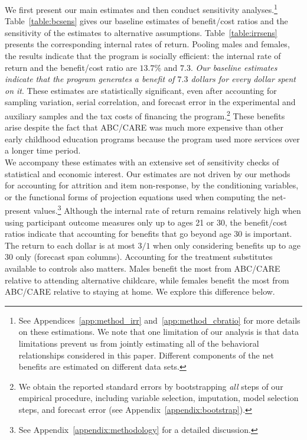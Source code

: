 \noindent We first present our main estimates and then conduct sensitivity analyses.\footnote{See Appendices~\ref{app:method_irr} and~\ref{app:method_cbratio} for more details on these estimations. We note that one limitation of our analysis is that data limitations prevent us from jointly estimating all of the behavioral relationships considered in this paper. Different components of the net benefits are estimated on different data sets.} Table~\ref{table:bcsens} gives our baseline estimates of benefit/cost ratios and the sensitivity of the estimates to alternative assumptions. Table~\ref{table:irrsens} presents the corresponding internal rates of return. Pooling males and females, the results indicate that the program is socially efficient: the internal rate of return and the benefit/cost ratio are $13.7\%$ and $7.3$. \textit{Our baseline estimates indicate that the program generates a benefit of $7.3$ dollars for every dollar spent on it}. These estimates are statistically significant, even after accounting for sampling variation, serial correlation, and forecast error in the experimental and auxiliary samples and the tax costs of financing the program.\footnote{We obtain the reported standard errors by bootstrapping \emph{all} steps of our empirical procedure, including variable selection, imputation, model selection steps, and forecast error (see  Appendix~\ref{appendix:bootstrap}).} These benefits arise despite the fact that ABC/CARE was much more expensive than other early childhood education programs because the program used more services over a longer time period.\\

\noindent We accompany these estimates with an extensive set of sensitivity checks of statistical and economic interest. Our estimates are not driven by our methods for accounting for attrition and item non-response, by the conditioning variables, or the functional forms of projection equations used when computing the net-present values.\footnote{See Appendix~\ref{appendix:methodology} for a detailed discussion.} Although the internal rate of return remains relatively high when using participant outcome measures only up to ages 21 or 30, the benefit/cost ratios indicate that accounting for benefits that go beyond age 30 is important. The return to each dollar is at most $3/1$ when only considering benefits up to age 30 only (forecast span columns). Accounting for the treatment substitutes available to controls also matters. Males benefit the most from ABC/CARE relative to attending alternative childcare, while females benefit the most from ABC/CARE relative to staying at home. We explore this difference below.\\

